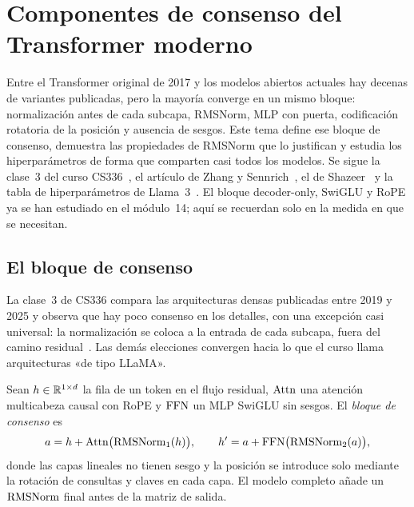 \chapter{Componentes de consenso del Transformer moderno}
\label{tema:1}

Entre el Transformer original de 2017 y los modelos abiertos actuales hay decenas de variantes publicadas, pero la mayoría converge en un mismo bloque: normalización antes de cada subcapa, RMSNorm, MLP con puerta, codificación rotatoria de la posición y ausencia de sesgos. Este tema define ese bloque de consenso, demuestra las propiedades de RMSNorm que lo justifican y estudia los hiperparámetros de forma que comparten casi todos los modelos. Se sigue la clase~3 del curso CS336~\cite{cs336}, el artículo de Zhang y Sennrich~\cite[§3--4]{rmsnorm}, el de Shazeer~\cite[§2--3]{shazeerglu} y la tabla de hiperparámetros de Llama~3~\cite[§3.2]{llama3}. El bloque decoder-only, SwiGLU y RoPE ya se han estudiado en el módulo~14; aquí se recuerdan solo en la medida en que se necesitan.

\section{El bloque de consenso}

La clase~3 de CS336 compara las arquitecturas densas publicadas entre 2019 y 2025 y observa que hay poco consenso en los detalles, con una excepción casi universal: la normalización se coloca a la entrada de cada subcapa, fuera del camino residual~\cite{cs336}. Las demás elecciones convergen hacia lo que el curso llama arquitecturas «de tipo LLaMA».

\begin{definicion}\label{def:consenso}
Sean $h\in\mathbb{R}^{1\times d}$ la fila de un token en el flujo residual, $\operatorname{Attn}$ una atención multicabeza causal con RoPE y $\operatorname{FFN}$ un MLP SwiGLU sin sesgos. El \emph{bloque de consenso} es
\[
a=h+\operatorname{Attn}\bigl(\operatorname{RMSNorm}_1(h)\bigr),\qquad h'=a+\operatorname{FFN}\bigl(\operatorname{RMSNorm}_2(a)\bigr),
\]
donde las capas lineales no tienen sesgo y la posición se introduce solo mediante la rotación de consultas y claves en cada capa. El modelo completo añade un $\operatorname{RMSNorm}$ final antes de la matriz de salida.
\end{definicion}


